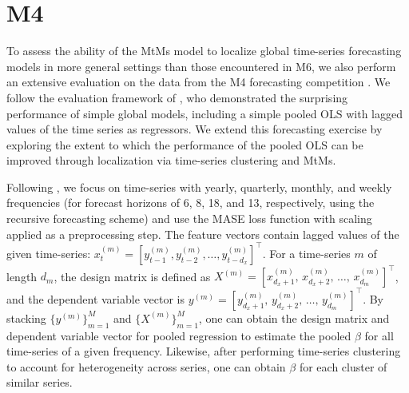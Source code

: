 \documentclass[3p,times,twocolumn]{elsarticle}
\begin{document}
\section{M4}\label{section:m4}

To assess the ability of the MtMs model to localize global time-series forecasting models in more general settings than those encountered in M6, we also perform an extensive evaluation on the data from the M4 forecasting competition \citep{makridakisM4Competition1002020}.
We follow the evaluation framework of \citet{montero-mansoPrinciplesAlgorithmsForecasting2021}, who demonstrated the surprising performance of simple global models, including a simple pooled OLS with lagged values of the time series as regressors.
We extend this forecasting exercise by exploring the extent to which the performance of the pooled OLS can be improved through localization via time-series clustering and MtMs.

Following \citet{montero-mansoPrinciplesAlgorithmsForecasting2021}, we focus on time-series with yearly, quarterly, monthly, and weekly frequencies (for forecast horizons of 6, 8, 18, and 13, respectively, using the recursive forecasting scheme) and use the MASE loss function with scaling applied as a preprocessing step.
The feature vectors contain lagged values of the given time-series: $x_{t}^{(m)}=[y_{t-1}^{(m)}, y_{t-2}^{(m)}, \ldots,y_{t-d_{x}}^{(m)}]^{\top}$.
For a time-series $m$ of length $d_{m}$, the design matrix is defined as $X^{(m)}=[x_{d_{x}+1}^{(m)},\,x_{d_{x}+2}^{(m)},\,\ldots,\,x_{d_{m}}^{(m)}]^{\top}$, and the dependent variable vector is $y^{(m)} = [y_{d_{x}+1}^{(m)},\,y_{d_{x}+2}^{(m)},\,\ldots,\,y_{d_{m}}^{(m)}]^{\top}$.
By stacking $\{y^{(m)}\}_{m=1}^{M}$ and $\{X^{(m)}\}_{m=1}^{M}$, one can obtain the design matrix and dependent variable vector for pooled regression to estimate the pooled $\beta$ for all time-series of a given frequency.
Likewise, after performing time-series clustering to account for heterogeneity across series, one can obtain $\beta$ for each cluster of similar series.
\end{document}
